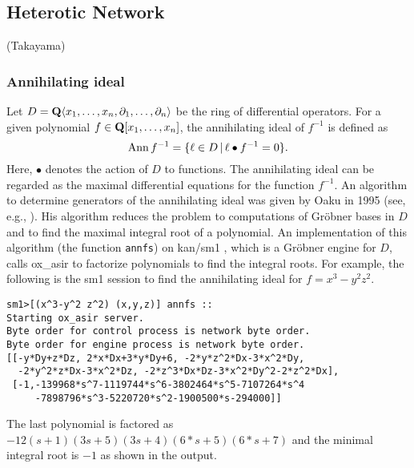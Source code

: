 
\subsection{Heterotic Network}   (Takayama)

\def\pd#1{ \partial_{#1} }
\subsubsection{Annihilating ideal}

Let $D = {\bf Q} \langle x_1, \ldots, x_n , \pd{1}, \ldots, \pd{n} \rangle$
be the ring of differential operators.
For a given polynomial
$ f \in {\bf Q}[x_1, \ldots, x_n] $,
the annihilating ideal of $f^{-1}$ is defined as
$$ {\rm Ann}\, f^{-1} = \{ \ell \in D \,|\,
  \ell \bullet f^{-1} = 0 \}.
$$
Here, $\bullet$ denotes the action of $D$ to functions.
The annihilating ideal can be regarded as the maximal differential
equations for the function $f^{-1}$.
An algorithm to determine generators of the annihilating ideal
was given by Oaku in 1995 (see, e.g., \cite[page ??]{sst-book}).
His algorithm reduces the problem to computations of Gr\"obner bases
in $D$ and to find the maximal integral root of a polynomial.
An implementation of this algorithm (the function {\tt annfs})
on kan/sm1 \cite{kan}, which is a Gr\"obner engine for $D$,
calls ox\_asir to factorize polynomials to find the integral
roots.
For example, the following is the sm1 session to find the annihilating
ideal for $f = x^3 - y^2 z^2$.
\begin{verbatim}
sm1>[(x^3-y^2 z^2) (x,y,z)] annfs ::
Starting ox_asir server.
Byte order for control process is network byte order.
Byte order for engine process is network byte order.
[[-y*Dy+z*Dz, 2*x*Dx+3*y*Dy+6, -2*y*z^2*Dx-3*x^2*Dy, 
  -2*y^2*z*Dx-3*x^2*Dz, -2*z^3*Dx*Dz-3*x^2*Dy^2-2*z^2*Dx], 
 [-1,-139968*s^7-1119744*s^6-3802464*s^5-7107264*s^4
     -7898796*s^3-5220720*s^2-1900500*s-294000]] 
\end{verbatim}
The last polynomial is factored as
$-12(s+1)(3s+5)(3s+4)(6*s+5)(6*s+7)$
and the minimal integral root is $-1$
as shown in the output.

